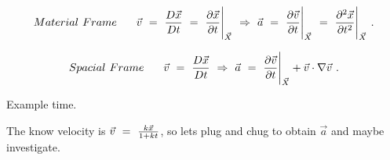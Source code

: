 \documentclass{article}
\newcounter{subsubsubsection}[subsubsection]
\begin{document}
\begin{equation} \label{eq:1}
Material \hspace{0.125cm}  Frame \hspace{0.625cm} \vec{v} \hspace{0.125cm} = \hspace{0.125cm} \frac{D \vec{x}}{D t} \hspace{0.125cm} = \hspace{0.125cm} \frac{\partial{\vec{x}}}{\partial{t}}\Bigg|_{\vec{X}} \hspace{0.125cm} \Rightarrow \hspace{0.125cm} \vec{a} \hspace{0.125cm} = \hspace{0.125cm} \frac{\partial{\vec{v}}}{\partial{t}}\Bigg|_{\vec{X}} \hspace{0.125cm} = \hspace{0.125cm} \frac{\partial^{2}{\vec{x}}}{\partial{t}^{2}} \Bigg|_{\vec{X}} \hspace{0.125cm} . \end{equation}  

\begin{equation} \label{eq:1}
Spacial \hspace{0.125cm}  Frame \hspace{0.625cm} \vec{v} \hspace{0.125cm} = \hspace{0.125cm} \frac{D \vec{x}}{D t} \hspace{0.125cm} \Rightarrow \hspace{0.125cm} \vec{a} \hspace{0.125cm} = \hspace{0.125cm} \frac{\partial{\vec{v}}}{\partial{t}}\Bigg|_{\vec{X}} + \vec{v}\cdot\nabla{\vec{v}} \hspace{0.125cm} . \end{equation}

Example time. 


The know velocity is \begin{math} \vec{v} \hspace{0.125cm} = \hspace{0.125cm} \frac{k \vec{x}}{1 + kt} \end{math}, so lets plug and chug to obtain \begin{math} \vec{a} \end{math} and maybe investigate.
\end{document}
